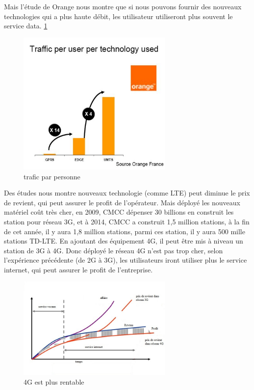Mais l'étude de Orange nous montre que si nous pouvons fournir des nouveaux technologies qui a plus haute débit, les utilisateur utiliseront plus souvent le service data.  \ref{traficparpersonne}
  \begin{figure}[H]
   \centering
   \includegraphics[width=3in]{images/orange.JPG}
   \caption{trafic par personne }
   \label{traficparpersonne}
  \end{figure}
 Des études nous montre nouveaux technologie (comme LTE) peut diminue le prix de revient, qui peut assurer le profit de l'opérateur. Mais déployé les nouveaux matériel coût très cher, en 2009, CMCC dépenser 30 billions \textyen en construit les station pour réseau 3G, et à 2014, CMCC a construit 1,5 million stations, à la fin de cet année, il y aura 1,8 million stations, parmi ces station, il y aura 500 mille stations TD-LTE. En ajoutant des équipement 4G, il peut être mis à niveau un station de 3G à 4G. Donc déployé le réseau 4G n'est pas trop cher, selon l'expérience précédente (de 2G à 3G), les utilisateurs iront utiliser plus le service internet, qui peut assurer le profit de l'entreprise.
      \begin{figure}[H]
          \centering
          \includegraphics[width=3in]{images/why4G.jpg}
          \caption{4G est plus rentable}
          \label{why4G}
      \end{figure}
  

